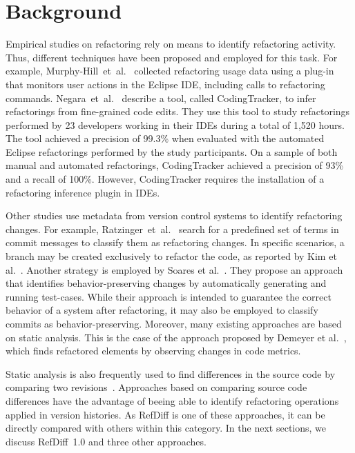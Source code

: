 \section{Background}
\label{SecBackground}

Empirical studies on refactoring rely on means to identify refactoring activity. Thus, different techniques have been proposed and employed for this task.
For example, Murphy-Hill~et~al.~\cite{MurphyHill2012} collected refactoring usage data using a plug-in that monitors user actions in the Eclipse IDE, including calls to refactoring commands.
Negara~et~al.~\cite{negara2013} describe a tool, called CodingTracker, to infer refactorings from fine-grained code edits. They use this tool to study refactorings performed by 23 developers working in their IDEs during a total of 1,520 hours. The tool achieved a precision of 99.3\% when evaluated with the automated Eclipse refactorings performed by the study participants.
On a sample of both manual and automated refactorings, CodingTracker achieved a precision of 93\% and a recall of 100\%.
However, CodingTracker requires the installation of a refactoring inference plugin in IDEs.

Other studies use metadata from version control systems to identify refactoring changes. For example, Ratzinger~et~al.~\cite{ratzinger2008relation} search for a predefined set of terms in commit messages to classify them as refactoring changes. In specific scenarios, a branch may be created exclusively to refactor the code, as reported by Kim et al.~\cite{kim-tse-2014}.
Another strategy is employed by Soares et al.~\cite{soares2010making}. They propose an approach that identifies behavior-preserving changes by automatically generating and running test-cases. While their approach is intended to guarantee the correct behavior of a system after refactoring, it may also be employed to classify commits as behavior-preserving.
Moreover, many existing approaches are based on static analysis.
This is the case of the approach proposed by Demeyer et al.~\cite{demeyer2000finding}, which finds refactored elements by observing changes in code metrics.

Static analysis is also frequently used to find differences in the source code by comparing two revisions~\cite{dig2006automated, weissgerber2006identifying, tsantalis_empiricalstudy,prete2010template,Kim:2010:RefFinder,msr2017,tsantalis2018rminer}.
Approaches based on comparing source code differences have the advantage of beeing able to identify refactoring operations applied in version histories.
As RefDiff is one of these approaches, it can be directly compared with others within this category. In the next sections, we discuss RefDiff~1.0 and three other approaches.

